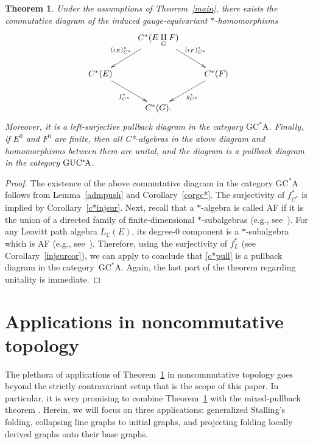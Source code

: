 \documentclass[12pt,times,a4paper]{amsart}
\newtheorem{theorem}{Theorem}[section]
\numberwithin{equation}{section}
\numberwithin{equation}{section}
\begin{document}
\begin{theorem}\label{c*cor}
Under the assumptions  of Theorem~\ref{main}, there exists
the commutative diagram of the induced gauge-equivariant $*$-\mbox{homo}\-morphisms
\begin{equation}\label{c*pull}
\xymatrix{
&
C^*(E\underset{G}{\amalg}F)
\ar[dl]_{(\iota_E)_{C^*}^*} \ar[dr]^{(\iota_F)^*_{C^*}}&\\
C^*(E)
\ar[dr]_{f^*_{C^*}}& & 
C^*(F)
\ar[dl]^{g^*_{C^*}}\\
& C^*(G). &
}
\end{equation}
Moreover, it is a left-surjective pullback diagram in the category $\mathrm{GC^*\!A}$. Finally, if $E^0$ and $F^0$ are finite,
 then all C*-algebras in the above 
diagram and homomorphisms between them are unital, and the diagram is a pullback diagram in the category ${\rm GUC^*\!A}$.
\end{theorem}
\begin{proof}
The existence of the above commutative diagram in the category $\mathrm{GC^*\!A}$
follows from Lemma~\ref{admpush} and Corollary~\ref{corgc*}. The surjectivity of $f^*_{C^*}$ is implied by
Corollary~\ref{c*injsur}. Next,
 recall that a $*$-algebra is called AF if it is the union of a directed family of finite-dimensional $*$-subalgebras 
(e.g., see~\cite[Definition~2.2]{a-c22}). 
For any Leavitt path algebra $L_\mathbb{C}(E)$, its degree-$0$ component is a $*$-subalgebra which is AF (e.g., 
see~\cite[Proposition~2.1.14]{aasm17}). 
Therefore, using the surjectivity of $f^*_L$ (see Corollary~\ref{injsurcor}), we can apply \cite[Theorem~2.6]{a-c22} to conclude that 
\eqref{c*pull} is a pullback diagram in the category~$\mathrm{GC^*\!A}$.
 Again, the last part of the theorem regarding unitality is immediate.
\end{proof}

\section{Applications in noncommutative topology}
\noindent
The plethora of applications of Theorem~\ref{c*cor} in noncommutative topology 
goes beyond the strictly contravariant setup that is the scope
of this paper. In particular, it is very promising to combine Theorem~\ref{c*cor} with the mixed-pullback theorem
 \cite[Theorem~5.2]{ht23}. Herein, we 
will focus on
three applications: generalized Stalling's folding, collapsing line graphs to initial graphs, and projecting folding locally derived graphs onto
 their base graphs. 
\end{document}

